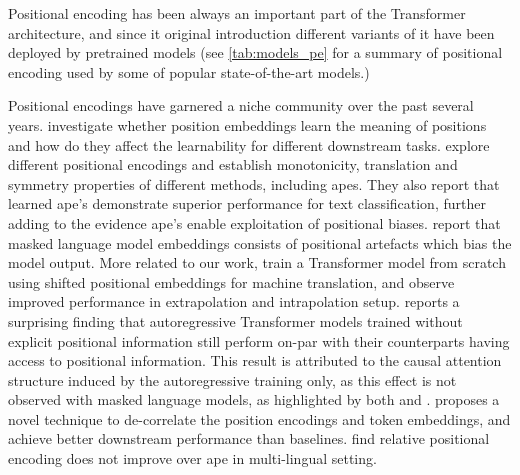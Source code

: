 \documentclass[letterpaper, 12pt]{report}
\begin{document}
Positional encoding has been always an important part of the Transformer architecture, and since it original introduction different variants of it have been deployed by pretrained models (see \autoref{tab:models_pe} for a summary of positional encoding used by some of popular state-of-the-art models.)

Positional encodings have garnered a niche community over the past several years.
\citet{wang-chen-2020-position} investigate whether position embeddings learn the meaning of positions and how do they affect the learnability for different downstream tasks.
\citet{wang2021on} explore different positional encodings and establish monotonicity, translation and symmetry properties of different methods, including \acrshort{ape}s.
They also report that learned \acrshort{ape}'s demonstrate superior performance for text classification, further adding to the evidence \acrshort{ape}'s enable exploitation of positional biases.
\citet{luo-etal-2021-positional} report that masked language model embeddings consists of positional artefacts which bias the model output.
More related to our work, \citet{kiyono2021} train a Transformer model from scratch using shifted positional embeddings for machine translation, and observe improved performance in extrapolation and intrapolation setup.
\citet{haviv2022} reports a surprising finding that autoregressive Transformer models trained without explicit positional information still perform on-par with their counterparts having access to positional information. This result is attributed to the causal attention structure induced by the autoregressive training only, as this effect is not observed with masked language models, as highlighted by both \citet{haviv2022} and \citet{sinha-etal-2021-masked}.
\citet{ke2021} proposes a novel technique to de-correlate the position encodings and token embeddings, and achieve better downstream performance than baselines.
\citet{ravishankar-etal-2021-multilingual} find relative positional encoding does not improve over \acrshort{ape} in multi-lingual setting.
\end{document}
